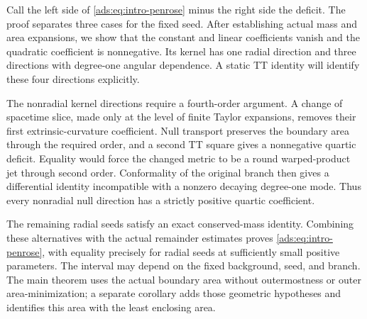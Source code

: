 Call the left side of \eqref{ads:eq:intro-penrose} minus the right side
the deficit. The proof separates three cases for the fixed seed.
After establishing actual mass and area expansions, we show that
the constant and linear coefficients vanish and the quadratic
coefficient is nonnegative. Its kernel has one radial direction and three
directions with degree-one angular dependence. A static TT identity
will identify these four directions explicitly.

The nonradial kernel directions require a fourth-order argument.
A change of spacetime slice, made only at the level of finite Taylor
expansions, removes their first extrinsic-curvature coefficient.
Null transport preserves the boundary area through the required
order, and a second TT square gives a nonnegative quartic deficit.
Equality would force the changed metric to be a round warped-product
jet through second order. Conformality of the original branch then
gives a differential identity incompatible with a nonzero decaying
degree-one mode. Thus every nonradial null direction has a strictly
positive quartic coefficient.

The remaining radial seeds satisfy an exact conserved-mass identity.
Combining these alternatives with the actual remainder estimates
proves \eqref{ads:eq:intro-penrose}, with equality precisely for radial
seeds at sufficiently small positive parameters. The interval may
depend on the fixed background, seed, and branch. The main theorem
uses the actual boundary area without outermostness or outer
area-minimization; a separate corollary adds those geometric
hypotheses and identifies this area with the least enclosing area.
